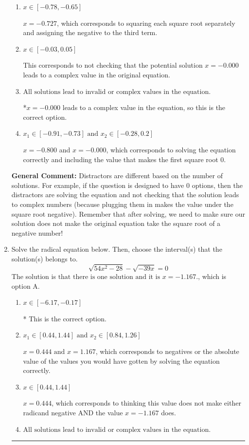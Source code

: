 \documentclass{extbook}[14pt]
\newcommand{\litem}[1]{\item #1

\rule{\textwidth}{0.4pt}}
\begin{document}
\begin{enumerate}
{\begin{enumerate}[label=\Alph*.]
$x = -0.800$ and $x = 0.667$, which corresponds to solving each radical separately for 0.
\item \( x \in [-0.78,-0.65] \)

$x = -0.727$, which corresponds to squaring each square root separately and assigning the negative to the third term.
\item \( x \in [-0.03,0.05] \)

This corresponds to not checking that the potential solution $x = -0.000$ leads to a complex value in the original equation.
\item \( \text{All solutions lead to invalid or complex values in the equation.} \)

*$x = -0.000$ leads to a complex value in the equation, so this is the correct option.
\item \( x_1 \in [-0.91, -0.73] \text{ and } x_2 \in [-0.28,0.2] \)

$x = -0.800$ and $x = -0.000$, which corresponds to solving the equation correctly and including the value that makes the first square root 0.
\end{enumerate}

\textbf{General Comment:} Distractors are different based on the number of solutions. For example, if the question is designed to have 0 options, then the distractors are solving the equation and not checking that the solution leads to complex numbers (because plugging them in makes the value under the square root negative). Remember that after solving, we need to make sure our solution does not make the original equation take the square root of a negative number!
}
\litem{
Solve the radical equation below. Then, choose the interval(s) that the solution(s) belongs to.
\[ \sqrt{54 x^2 - 28} - \sqrt{-39 x} = 0 \]The solution is \( \text{that there is one solution and it is } x = -1.167. \), which is option A.\begin{enumerate}[label=\Alph*.]
\item \( x \in [-6.17,-0.17] \)

* This is the correct option.
\item \( x_1 \in [0.44, 1.44] \text{ and } x_2 \in [0.84,1.26] \)

$x = 0.444 \text{ and } x = 1.167$, which corresponds to negatives or the absolute value of the values you would have gotten by solving the equation correctly.
\item \( x \in [0.44,1.44] \)

$x = 0.444$, which corresponds to thinking this value does not make either radicand negative AND the value $x = -1.167$ does.
\item \( \text{All solutions lead to invalid or complex values in the equation.} \)


\end{enumerate}}
\end{enumerate}
\end{document}

